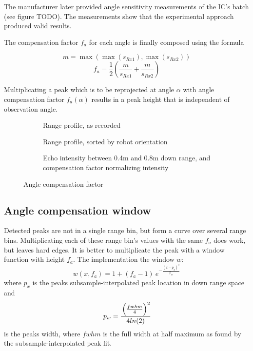 The manufacturer later provided angle sensitivity measurements of the
IC's batch (see figure TODO). The measurements show that the
experimental approach produced valid results.

The compensation factor \(f_a\) for each angle is finally composed using
the formula

\[m = \max \left( \max (s_{Rx1}), \max (s_{Rx2}) \right)\] \[
f_a = \frac{1}{2}
  \left(
    \frac{m}{ s_{Rx1} } +
    \frac{m}{ s_{Rx2} }
  \right)
\]

Multiplicating a peak which is to be reprojected at angle \(\alpha\)
with angle compensation factor \(f_a(\alpha)\) results in a peak height
that is independent of observation angle.

\begin{figure}[htbp]
    \centering
    \begin{subfigure}{\textwidth}
        \centering
        \def\svgscale{0.8} \small
        
        \caption{Range profile, as recorded}
        \bigskip
    \end{subfigure}
    \begin{subfigure}{\textwidth}
        \centering
        \def\svgscale{0.8} \small
        
        \caption{Range profile, sorted by robot orientation}
        \bigskip
    \end{subfigure}
    \begin{subfigure}{\textwidth}
        \centering
        \def\svgscale{0.8} \small
        
        \caption{Echo intensity between 0.4m and 0.8m down range, and compensation factor normalizing intensity}
        \bigskip
    \end{subfigure}
    \caption{Angle compensation factor}
    \label{fig:fig_angle_compensation}
\end{figure}

\subsection{Angle compensation window}\label{angle-compensation-window}

Detected peaks are not in a single range bin, but form a curve over
several range bins. Multiplicating each of these range bin's values with
the same \(f_a\) does work, but leaves hard edges. It is better to
multiplicate the peak with a window function with height \(f_a\). The
implementation the window \(w\):
\[
w(x,f_a) = 1 + (f_a - 1) ~e ^ { -\frac{ \left( {x - p_x} \right) ^ 2 } {p_w} }
\] where \(p_x\) is the peaks subsample-interpolated peak location in
down range space and
\[
p_w = \cfrac{
\left( \frac{fwhm}{4}  \right) ^2
}{
4 ln(2)}
\]
is
the peaks width, where \(fwhm\) is the full width at half maximum as
found by the subsample-interpolated peak fit.

